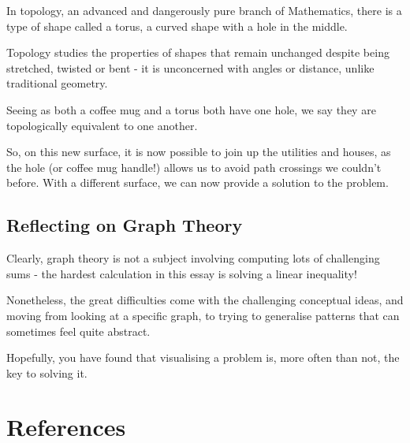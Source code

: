 \documentclass{article}
\begin{document}
In topology, an advanced and dangerously pure branch of Mathematics, there is a type of shape called a torus, a curved shape with a hole in the middle.

Topology studies the properties of shapes that remain unchanged despite being stretched, twisted or bent - it is unconcerned with angles or distance, unlike traditional geometry. 

Seeing as both a coffee mug and a torus both have one hole, we say they are topologically equivalent to one another.

So, on this new surface, it is now possible to join up the utilities and houses, as the hole (or coffee mug handle!) allows us to avoid  path crossings we couldn't before. With a different surface, we can now provide a solution to the problem.

\subsection{Reflecting on Graph Theory}
Clearly, graph theory is not a subject involving computing lots of challenging sums - the hardest calculation in this essay is solving a linear inequality!

Nonetheless, the great difficulties come with the challenging conceptual ideas, and moving from looking at a specific graph, to trying to generalise patterns that can sometimes feel quite abstract. 

Hopefully, you have found that visualising a problem is, more often than not, the key to solving it.

\section*{References}
\end{document}
